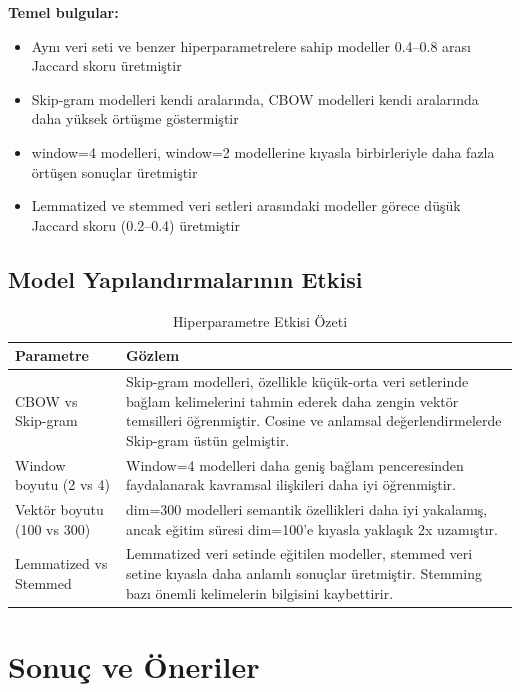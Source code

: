 \documentclass[12pt, a4paper]{article}
\begin{document}
\textbf{Temel bulgular:}
\begin{itemize}
    \item Aynı veri seti ve benzer hiperparametrelere sahip modeller 0.4--0.8 arası Jaccard skoru üretmiştir
    \item Skip-gram modelleri kendi aralarında, CBOW modelleri kendi aralarında daha yüksek örtüşme göstermiştir
    \item window=4 modelleri, window=2 modellerine kıyasla birbirleriyle daha fazla örtüşen sonuçlar üretmiştir
    \item Lemmatized ve stemmed veri setleri arasındaki modeller görece düşük Jaccard skoru (0.2--0.4) üretmiştir
\end{itemize}

\subsection{Model Yapılandırmalarının Etkisi}

\begin{table}[H]
\centering
\caption{Hiperparametre Etkisi Özeti}
\begin{tabular}{lp{9cm}}
\toprule
\textbf{Parametre} & \textbf{Gözlem} \\
\midrule
CBOW vs Skip-gram & Skip-gram modelleri, özellikle küçük-orta veri setlerinde bağlam kelimelerini tahmin ederek daha zengin vektör temsilleri öğrenmiştir. Cosine ve anlamsal değerlendirmelerde Skip-gram üstün gelmiştir. \\
\midrule
Window boyutu (2 vs 4) & Window=4 modelleri daha geniş bağlam penceresinden faydalanarak kavramsal ilişkileri daha iyi öğrenmiştir. \\
\midrule
Vektör boyutu (100 vs 300) & dim=300 modelleri semantik özellikleri daha iyi yakalamış, ancak eğitim süresi dim=100'e kıyasla yaklaşık 2x uzamıştır. \\
\midrule
Lemmatized vs Stemmed & Lemmatized veri setinde eğitilen modeller, stemmed veri setine kıyasla daha anlamlı sonuçlar üretmiştir. Stemming bazı önemli kelimelerin bilgisini kaybettirir. \\
\bottomrule
\end{tabular}
\end{table}

\section{Sonuç ve Öneriler}
\end{document}
